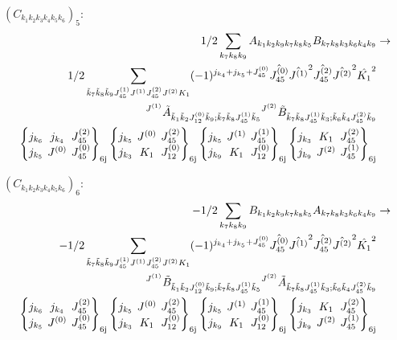 \documentclass[11pt]{article}
\newcommand{\sixj}[6]{\begingroup\setlength{\arraycolsep}{0.2em}\begin{Bmatrix} #1 & #2 & #3 \\ #4 & #5 & #6 \end{Bmatrix}_{\text{6j}}\endgroup}
\begin{document}
$\left({C}_{{k}_{1}{k}_{2}{k}_{3}{k}_{4}{k}_{5}{k}_{6}}\right)_{5}$:
\begin{align}
1/2\sum_{{k}_{7}{k}_{8}{k}_{9}}{A}_{{k}_{1}{k}_{2}{k}_{9}{k}_{7}{k}_{8}{k}_{5}}{B}_{{k}_{7}{k}_{8}{k}_{3}{k}_{6}{k}_{4}{k}_{9}}&\rightarrow \notag \\1/2\sum_{\tilde{k}_{7}\tilde{k}_{8}\tilde{k}_{9}J^{(1)}_{45}J^{(1)}J^{(2)}_{45}J^{(2)}K_{1}}(-1)^{j_{{k}_{4}} +j_{{k}_{5}} +J^{(0)}_{45} }\hat{J^{(0)}_{45}}\hat{J^{(1)}}^{2}\hat{J^{(2)}_{45}}\hat{J^{(2)}}^{2}\hat{K_{1}}^{2}& \notag \\{}^{J^{(1)}}\tilde{A}_{\tilde{k}_{1}\tilde{k}_{2}J^{(0)}_{12}\tilde{k}_{9};\tilde{k}_{7}\tilde{k}_{8}J^{(1)}_{45}\tilde{k}_{5}}{}^{J^{(2)}}\tilde{B}_{\tilde{k}_{7}\tilde{k}_{8}J^{(1)}_{45}\tilde{k}_{3};\tilde{k}_{6}\tilde{k}_{4}J^{(2)}_{45}\tilde{k}_{9}}& \notag \\\sixj{j_{{k}_{6}}}{j_{{k}_{4}}}{J^{(2)}_{45}}{j_{{k}_{5}}}{J^{(0)}}{J^{(0)}_{45}}\sixj{j_{{k}_{5}}}{J^{(0)}}{J^{(2)}_{45}}{j_{{k}_{3}}}{K_{1}}{J^{(0)}_{12}}\sixj{j_{{k}_{5}}}{J^{(1)}}{J^{(1)}_{45}}{j_{{k}_{9}}}{K_{1}}{J^{(0)}_{12}}\sixj{j_{{k}_{3}}}{K_{1}}{J^{(2)}_{45}}{j_{{k}_{9}}}{J^{(2)}}{J^{(1)}_{45}}
\end{align}

$\left({C}_{{k}_{1}{k}_{2}{k}_{3}{k}_{4}{k}_{5}{k}_{6}}\right)_{6}$:
\begin{align}
-1/2\sum_{{k}_{7}{k}_{8}{k}_{9}}{B}_{{k}_{1}{k}_{2}{k}_{9}{k}_{7}{k}_{8}{k}_{5}}{A}_{{k}_{7}{k}_{8}{k}_{3}{k}_{6}{k}_{4}{k}_{9}}&\rightarrow \notag \\-1/2\sum_{\tilde{k}_{7}\tilde{k}_{8}\tilde{k}_{9}J^{(1)}_{45}J^{(1)}J^{(2)}_{45}J^{(2)}K_{1}}(-1)^{j_{{k}_{4}} +j_{{k}_{5}} +J^{(0)}_{45} }\hat{J^{(0)}_{45}}\hat{J^{(1)}}^{2}\hat{J^{(2)}_{45}}\hat{J^{(2)}}^{2}\hat{K_{1}}^{2}& \notag \\{}^{J^{(1)}}\tilde{B}_{\tilde{k}_{1}\tilde{k}_{2}J^{(0)}_{12}\tilde{k}_{9};\tilde{k}_{7}\tilde{k}_{8}J^{(1)}_{45}\tilde{k}_{5}}{}^{J^{(2)}}\tilde{A}_{\tilde{k}_{7}\tilde{k}_{8}J^{(1)}_{45}\tilde{k}_{3};\tilde{k}_{6}\tilde{k}_{4}J^{(2)}_{45}\tilde{k}_{9}}& \notag \\\sixj{j_{{k}_{6}}}{j_{{k}_{4}}}{J^{(2)}_{45}}{j_{{k}_{5}}}{J^{(0)}}{J^{(0)}_{45}}\sixj{j_{{k}_{5}}}{J^{(0)}}{J^{(2)}_{45}}{j_{{k}_{3}}}{K_{1}}{J^{(0)}_{12}}\sixj{j_{{k}_{5}}}{J^{(1)}}{J^{(1)}_{45}}{j_{{k}_{9}}}{K_{1}}{J^{(0)}_{12}}\sixj{j_{{k}_{3}}}{K_{1}}{J^{(2)}_{45}}{j_{{k}_{9}}}{J^{(2)}}{J^{(1)}_{45}}
\end{align}
\end{document}
